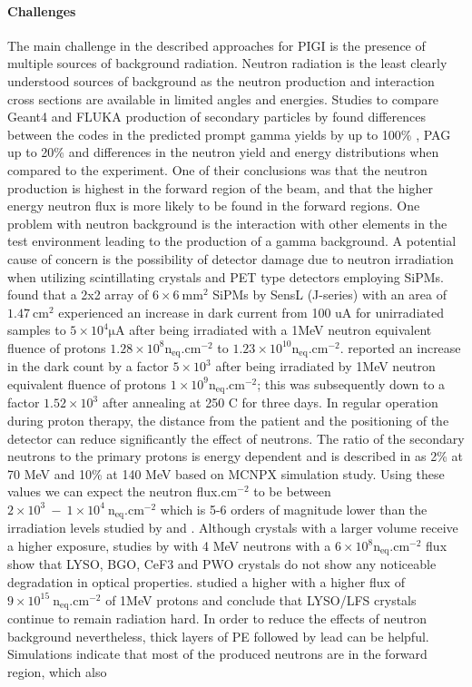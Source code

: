 \documentclass[11pt,a4paper]{article}
\begin{document}
\paragraph{Challenges}
The main challenge in the described approaches for PIGI is the presence of multiple sources of background radiation. Neutron radiation is the least clearly understood sources of background as the neutron production and interaction cross sections are available in limited angles and energies. Studies to compare Geant4 and FLUKA production of secondary particles by \cite{Robert2013}  found differences between the codes in the predicted prompt gamma yields by up to 100\% , PAG up to 20\% and differences in the neutron yield and energy distributions when compared to the experiment. One of their conclusions was that the neutron production is highest in the forward region of the beam, and that the higher energy neutron flux is more likely  to be found in the forward regions. One problem with neutron background is the interaction with other elements in the test environment leading to the production of a gamma background. A potential cause of concern is the possibility of detector damage due to neutron irradiation when utilizing scintillating crystals and PET type detectors employing SiPMs. \cite{Ulyanov2020} found that a 2x2 array  of $\mathrm{6\times6\ mm^2}$ SiPMs by SensL (J-series) with an area of $\mathrm{1.47\ cm^{2}}$ experienced an increase in dark current from 100 uA for unirradiated samples to $\mathrm{5 \times 10^{4} \mu A }$ after being irradiated with a 1MeV neutron equivalent fluence of protons $\mathrm{1.28\times 10^{8} n_{eq}.cm^{-2}}$ to $\mathrm{ 1.23\times 10^{10} n_{eq}.cm^{-2}}$.  \cite{Garutti2019} reported an increase in the dark count by a factor $\mathrm{5\times 10^{3}}$ after being  irradiated by 1MeV neutron equivalent fluence of protons  $\mathrm{1 \times 10^{9}n_{eq}.cm^{-2} }$; this was subsequently down to a factor $\mathrm{1.52 \times 10^{3} }$ after annealing at 250 C for three days. In regular operation during proton therapy, the distance from the patient and the positioning of the detector can reduce significantly the effect of neutrons. The ratio of the secondary neutrons to the primary protons is energy dependent and is described in \cite{JiaNeutron2014} as 2\%  at 70 MeV and 10\% at 140 MeV based on MCNPX simulation study. Using these values we can expect the neutron flux.$\mathrm{cm^{-2}}$ to be between $\mathrm{2 \times 10^{3}\ -\ 1 \times 10^{4} \ n_{eq}.cm^{-2} }$ which is 5-6 orders of magnitude lower than the irradiation levels studied by  \cite{Garutti2019} and  \cite{Ulyanov2020}. Although crystals with a larger volume receive a higher exposure, studies by \cite{ZhangNeutron2009} with 4 MeV neutrons with a $\mathrm{6 \times 10^{8}n_{eq}.cm^{-2} }$ flux show that LYSO, BGO, CeF3  and PWO crystals do not show any noticeable  degradation in optical properties. \cite{HuNeutron2020} studied a higher  with a higher flux of $\mathrm{9\times 10^{15}\ n_{eq}.cm^{-2}}$ of 1MeV protons and conclude that LYSO/LFS crystals continue to remain radiation hard. In order to reduce the effects of neutron background  nevertheless, thick layers of PE followed by lead can be helpful. Simulations indicate that most of the produced neutrons are in the forward region, which also 
\end{document}
